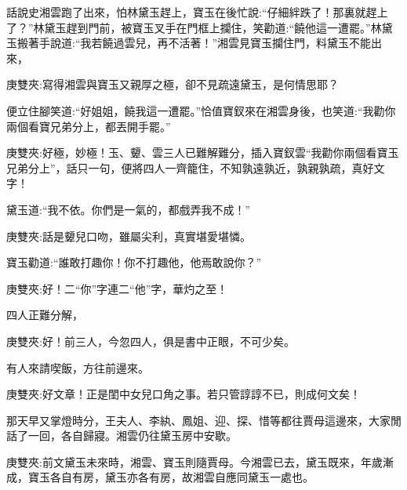 \begin{parag}
    話說史湘雲跑了出來，怕林黛玉趕上，寶玉在後忙說:“仔細絆跌了！那裏就趕上了？”林黛玉趕到門前，被寶玉叉手在門框上攔住，笑勸道:“饒他這一遭罷。”林黛玉搬著手說道:“我若饒過雲兒，再不活著！”湘雲見寶玉攔住門，料黛玉不能出來，\begin{note}庚雙夾:寫得湘雲與寶玉又親厚之極，卻不見疏遠黛玉，是何情思耶？\end{note}便立住腳笑道:“好姐姐，饒我這一遭罷。”恰值寶釵來在湘雲身後，也笑道:“我勸你兩個看寶兄弟分上，都丟開手罷。”\begin{note}庚雙夾:好極，妙極！玉、顰、雲三人已難解難分，插入寶釵雲“我勸你兩個看寶玉兄弟分上”，話只一句，便將四人一齊籠住，不知孰遠孰近，孰親孰疏，真好文字！\end{note}黛玉道:“我不依。你們是一氣的，都戲弄我不成！”\begin{note}庚雙夾:話是顰兒口吻，雖屬尖利，真實堪愛堪憐。\end{note}寶玉勸道:“誰敢打趣你！你不打趣他，他焉敢說你？”\begin{note}庚雙夾:好！二“你”字連二“他”字，華灼之至！\end{note}四人正難分解，\begin{note}庚雙夾:好！前三人，今忽四人，俱是書中正眼，不可少矣。\end{note}有人來請喫飯，方往前邊來。\begin{note}庚雙夾:好文章！正是閨中女兒口角之事。若只管諄諄不已，則成何文矣！\end{note}
\end{parag}


\begin{parag}
    那天早又掌燈時分，王夫人、李紈、鳳姐、迎、探、惜等都往賈母這邊來，大家閒話了一回，各自歸寢。湘雲仍往黛玉房中安歇。\begin{note}庚雙夾:前文黛玉未來時，湘雲、寶玉則隨賈母。今湘雲已去，黛玉既來，年歲漸成，寶玉各自有房，黛玉亦各有房，故湘雲自應同黛玉一處也。\end{note}
\end{parag}


